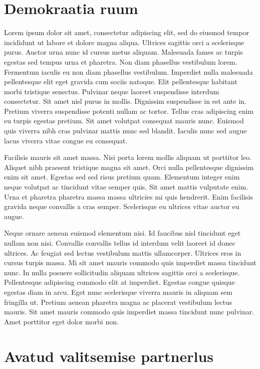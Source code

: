 \documentclass[]{book}
\begin{document}
\hypertarget{chapter03}{%
\section*{Demokraatia ruum}\label{chapter03}}

Lorem ipsum dolor sit amet, consectetur adipiscing elit, sed do eiusmod tempor incididunt ut labore et dolore magna aliqua. Ultrices sagittis orci a scelerisque purus. Auctor urna nunc id cursus metus aliquam. Malesuada fames ac turpis egestas sed tempus urna et pharetra. Non diam phasellus vestibulum lorem. Fermentum iaculis eu non diam phasellus vestibulum. Imperdiet nulla malesuada pellentesque elit eget gravida cum sociis natoque. Elit pellentesque habitant morbi tristique senectus. Pulvinar neque laoreet suspendisse interdum consectetur. Sit amet nisl purus in mollis. Dignissim suspendisse in est ante in. Pretium viverra suspendisse potenti nullam ac tortor. Tellus cras adipiscing enim eu turpis egestas pretium. Sit amet volutpat consequat mauris nunc. Euismod quis viverra nibh cras pulvinar mattis nunc sed blandit. Iaculis nunc sed augue lacus viverra vitae congue eu consequat.

Facilisis mauris sit amet massa. Nisi porta lorem mollis aliquam ut porttitor leo. Aliquet nibh praesent tristique magna sit amet. Orci nulla pellentesque dignissim enim sit amet. Egestas sed sed risus pretium quam. Elementum integer enim neque volutpat ac tincidunt vitae semper quis. Sit amet mattis vulputate enim. Urna et pharetra pharetra massa massa ultricies mi quis hendrerit. Enim facilisis gravida neque convallis a cras semper. Scelerisque eu ultrices vitae auctor eu augue.

Neque ornare aenean euismod elementum nisi. Id faucibus nisl tincidunt eget nullam non nisi. Convallis convallis tellus id interdum velit laoreet id donec ultrices. Ac feugiat sed lectus vestibulum mattis ullamcorper. Ultrices eros in cursus turpis massa. Mi sit amet mauris commodo quis imperdiet massa tincidunt nunc. In nulla posuere sollicitudin aliquam ultrices sagittis orci a scelerisque. Pellentesque adipiscing commodo elit at imperdiet. Egestas congue quisque egestas diam in arcu. Eget nunc scelerisque viverra mauris in aliquam sem fringilla ut. Pretium aenean pharetra magna ac placerat vestibulum lectus mauris. Sit amet mauris commodo quis imperdiet massa tincidunt nunc pulvinar. Amet porttitor eget dolor morbi non.

\hypertarget{chapter04}{%
\section*{Avatud valitsemise partnerlus}\label{chapter04}}
\end{document}
